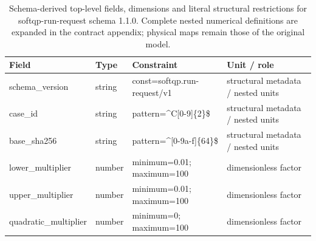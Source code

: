 \begin{table}[htbp]\centering\footnotesize
\caption{Schema-derived top-level fields, dimensions and literal structural restrictions for softqp-run-request schema 1.1.0. Complete nested numerical definitions are expanded in the contract appendix; physical maps remain those of the original model.}\label{tab:contract-softqp-run-request}
\begin{tabularx}{\textwidth}{@{}>{\raggedright\arraybackslash}p{}>{\raggedright\arraybackslash}p{}>{\raggedright\arraybackslash}X>{\raggedright\arraybackslash}X@{}}\toprule
Field & Type & Constraint & Unit / role\\\midrule
schema\_\allowbreak{}version & string & const=\allowbreak{}softqp.\allowbreak{}run-\allowbreak{}request/\allowbreak{}v1 & structural metadata /\allowbreak{} nested units\\
case\_\allowbreak{}id & string & pattern=\allowbreak{}\textasciicircum{}C[0-9]\{2\}\$ & structural metadata /\allowbreak{} nested units\\
base\_\allowbreak{}sha256 & string & pattern=\allowbreak{}\textasciicircum{}[0-9a-\allowbreak{}f]\{64\}\$ & structural metadata /\allowbreak{} nested units\\
lower\_\allowbreak{}multiplier & number & minimum=\allowbreak{}0.\allowbreak{}01; maximum=\allowbreak{}100 & dimensionless factor\\
upper\_\allowbreak{}multiplier & number & minimum=\allowbreak{}0.\allowbreak{}01; maximum=\allowbreak{}100 & dimensionless factor\\
quadratic\_\allowbreak{}multiplier & number & minimum=\allowbreak{}0; maximum=\allowbreak{}100 & dimensionless factor\\
\bottomrule\end{tabularx}
\end{table}
